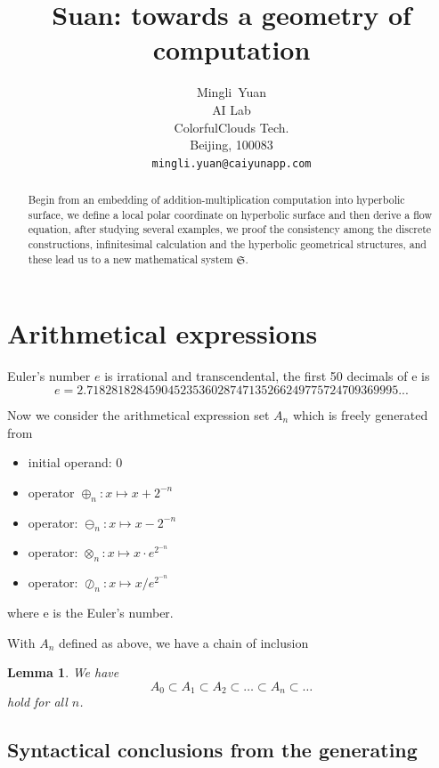 \documentclass{article}
\title{Suan: towards a geometry of computation}
\author{
  Mingli~Yuan \\
  AI Lab \\
  ColorfulClouds Tech.\\
  Beijing, 100083 \\
  \texttt{mingli.yuan@caiyunapp.com} \\
}
\newtheorem{lemma}{Lemma}
\begin{document}
\maketitle

\begin{abstract}
    Begin from an embedding of addition-multiplication computation into hyperbolic surface, we define a local polar
    coordinate on hyperbolic surface and then derive a flow equation, after studying several examples, we proof the
    consistency among the discrete constructions, infinitesimal calculation and the hyperbolic geometrical structures, and
    these lead us to a new mathematical system $\mathfrak{S}$.
\end{abstract}


\setcounter{tocdepth}{2}
\tableofcontents

\section{Arithmetical expressions}\label{sec:expressions}

Euler's number $e$ is irrational and transcendental, the first 50 decimals of e is
$$
e = 2.71828182845904523536028747135266249775724709369995...
$$

Now we consider the arithmetical expression set $A_n$ which is freely generated from
\begin{itemize}
    \item initial operand: $0$
    \item operator $\oplus_n: x \mapsto x + 2^{-n}$
    \item operator: $\ominus_n: x \mapsto x - 2^{-n}$
    \item operator: $\otimes_n: x \mapsto x \cdot e^{2^{-n}}$
    \item operator: $\oslash_n: x \mapsto x / e^{2^{-n}}$
\end{itemize}
where e is the Euler's number.

With $A_n$ defined as above, we have a chain of inclusion
\begin{lemma}
\label{lemma:chainofinclusion1}
We have
$$ A_0 \subset A_1 \subset A_2 \subset \ldots \subset A_n \subset \ldots $$
hold for all $n$.
\end{lemma}

\subsection{Syntactical conclusions from the generating}\label{sec:generating}
\end{document}
